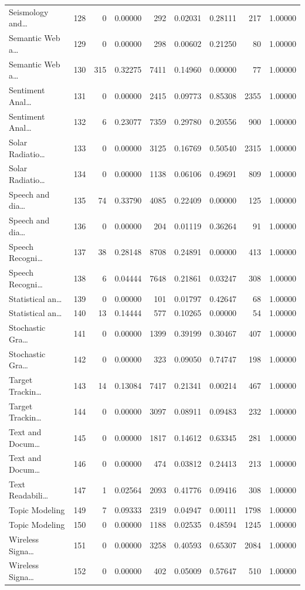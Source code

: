 \begin{table}
\begin{tabular}{lrrrrrrrr}
Seismology and… & 128 & 0 & 0.00000 & 292 & 0.02031 & 0.28111 & 217 & 1.00000 \\
Semantic Web a… & 129 & 0 & 0.00000 & 298 & 0.00602 & 0.21250 & 80 & 1.00000 \\
Semantic Web a… & 130 & 315 & 0.32275 & 7411 & 0.14960 & 0.00000 & 77 & 1.00000 \\
Sentiment Anal… & 131 & 0 & 0.00000 & 2415 & 0.09773 & 0.85308 & 2355 & 1.00000 \\
Sentiment Anal… & 132 & 6 & 0.23077 & 7359 & 0.29780 & 0.20556 & 900 & 1.00000 \\
Solar Radiatio… & 133 & 0 & 0.00000 & 3125 & 0.16769 & 0.50540 & 2315 & 1.00000 \\
Solar Radiatio… & 134 & 0 & 0.00000 & 1138 & 0.06106 & 0.49691 & 809 & 1.00000 \\
Speech and dia… & 135 & 74 & 0.33790 & 4085 & 0.22409 & 0.00000 & 125 & 1.00000 \\
Speech and dia… & 136 & 0 & 0.00000 & 204 & 0.01119 & 0.36264 & 91 & 1.00000 \\
Speech Recogni… & 137 & 38 & 0.28148 & 8708 & 0.24891 & 0.00000 & 413 & 1.00000 \\
Speech Recogni… & 138 & 6 & 0.04444 & 7648 & 0.21861 & 0.03247 & 308 & 1.00000 \\
Statistical an… & 139 & 0 & 0.00000 & 101 & 0.01797 & 0.42647 & 68 & 1.00000 \\
Statistical an… & 140 & 13 & 0.14444 & 577 & 0.10265 & 0.00000 & 54 & 1.00000 \\
Stochastic Gra… & 141 & 0 & 0.00000 & 1399 & 0.39199 & 0.30467 & 407 & 1.00000 \\
Stochastic Gra… & 142 & 0 & 0.00000 & 323 & 0.09050 & 0.74747 & 198 & 1.00000 \\
Target Trackin… & 143 & 14 & 0.13084 & 7417 & 0.21341 & 0.00214 & 467 & 1.00000 \\
Target Trackin… & 144 & 0 & 0.00000 & 3097 & 0.08911 & 0.09483 & 232 & 1.00000 \\
Text and Docum… & 145 & 0 & 0.00000 & 1817 & 0.14612 & 0.63345 & 281 & 1.00000 \\
Text and Docum… & 146 & 0 & 0.00000 & 474 & 0.03812 & 0.24413 & 213 & 1.00000 \\
Text Readabili… & 147 & 1 & 0.02564 & 2093 & 0.41776 & 0.09416 & 308 & 1.00000 \\
Topic Modeling & 149 & 7 & 0.09333 & 2319 & 0.04947 & 0.00111 & 1798 & 1.00000 \\
Topic Modeling & 150 & 0 & 0.00000 & 1188 & 0.02535 & 0.48594 & 1245 & 1.00000 \\
Wireless Signa… & 151 & 0 & 0.00000 & 3258 & 0.40593 & 0.65307 & 2084 & 1.00000 \\
Wireless Signa… & 152 & 0 & 0.00000 & 402 & 0.05009 & 0.57647 & 510 & 1.00000 \\
\bottomrule
\end{tabular}
\end{table}
